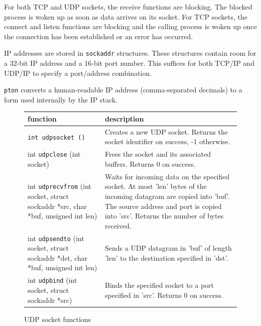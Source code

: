 \documentclass[11pt,twoside,abstract,notitlepage]{scrreprt}
\begin{document}
For both TCP and UDP sockets, the receive functions are blocking. The blocked process is woken up as soon as data arrives on its socket.  For TCP sockets, the connect and listen functions are blocking and the calling process is woken up once the connection has been established or an error has occurred.

IP addresses are stored in \texttt{sockaddr} structures. These structures contain room for a 32-bit IP address and a 16-bit port number. This suffices for both TCP/IP and UDP/IP to specify a port/address combination.

\texttt{pton} converts a human-readable IP address (comma-separated decimals) to a form used internally by the IP stack.

\begin{figure}[h]
\normalsize
\renewcommand{\arraystretch}{1.2}
\centering
\caption{UDP socket functions}
\label{fig:udpsockets}
\begin{tabularx}{\textwidth}{X|X}
\textbf{function} & \textbf{description} \\ \hline
\texttt{int udpsocket ()} & Creates a new UDP socket. Returns the socket identifier on success, -1 otherwise. \\ \hline
int \texttt{udpclose} (int socket) & Frees the socket and its associated buffers. Returns 0 on success. \\ \hline
int \texttt{udprecvfrom} (int socket, struct sockaddr *src, char *buf, unsigned int len) & Waits for incoming data on the specified socket. At most 'len' bytes of the incoming datagram are copied into 'buf'. The source address and port is copied into 'src'. Returns the number of bytes received. \\ \hline
int \texttt{udpsendto} (int socket, struct sockaddr *dst, char *buf, unsigned int len) & Sends a UDP datagram in 'buf' of length 'len' to the destination specified in 'dst'. \\ \hline
int \texttt{udpbind} (int socket, struct sockaddr *src) & Binds the specified socket to a port specified in 'src'. Returns 0 on success.\\
\end{tabularx}
\end{figure}
\end{document}
